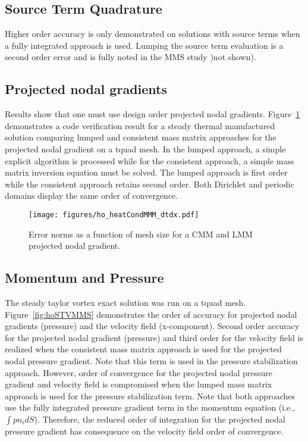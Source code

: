 \subsection{Source Term Quadrature}
Higher order accuracy is only demonstrated on solutions with source terms when a fully integrated
approach is used. Lumping the source term evaluation is a second order error and is fully noted in
the MMS study )not shown).

\subsection{Projected nodal gradients}
Results show that one must use design order projected nodal gradients. Figure~\ref{fig:pngTempMMS} demonstrates 
a code verification result for a steady thermal manufactured solution comparing lumped and consistent mass
matrix approaches for the projected nodal gradient on a tquad mesh. In the lumped approach, a simple 
explicit algorithm is processed while for the consistent approach, a simple mass matrix inversion equation 
must be solved. The lumped approach is first order while the consistent approach retains second order. Both
Dirichlet and periodic domains display the same order of convergence.

\begin{figure}
\centerline{\texttt{[image: figures/ho\_heatCondMMM\_dtdx.pdf]}}
\caption{Error norms as a function of mesh size for a CMM and LMM projected nodal gradient.}
\label{fig:pngTempMMS}
\end{figure}

\subsection{Momentum and Pressure}
The steady taylor vortex exact solution was run on a tquad mesh. Figure~\ref{fig:hoSTVMMS} demonstrates 
the order of accuracy for projected nodal gradients (pressure) and the velocity field (x-component). 
Second order accuracy for the projected nodal gradient (pressure) and third order for the velocity field
is realized when the consistent mass matrix approach is used for the projected nodal pressure gradient. 
Note that this term is used in the pressure stabilization approach. However, order of convergence for 
the projected nodal pressure gradient and velocity field is compromised when the lumped mass matrix approach
is used for the pressure stabilization term. Note that both approaches use the fully integrated pressure
gradient term in the momentum equation (i.e., $\int p n_i dS$). Therefore, the reduced order of integration
for the projected nodal pressure gradient has consequence on the velocity field order of convergence.
 
